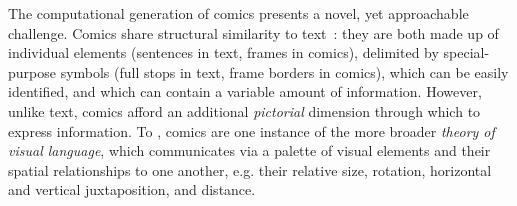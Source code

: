 The computational generation of comics presents a novel, yet approachable
challenge. Comics share structural similarity to
text~\cite{saraceni2016relatedness}: they are both made up of individual
elements (sentences in text, frames in comics), delimited by special-purpose
symbols (full stops in text, frame borders in comics), which can be easily
identified, and which can contain a variable amount of information. However,
unlike text, comics afford an additional \emph{pictorial} dimension through
which to express information. To , comics are one instance
of the more broader \emph{theory of visual language}, which communicates via a
palette of visual elements and their spatial relationships to one another, e.g.
their relative size, rotation, horizontal and vertical juxtaposition, and
distance.



